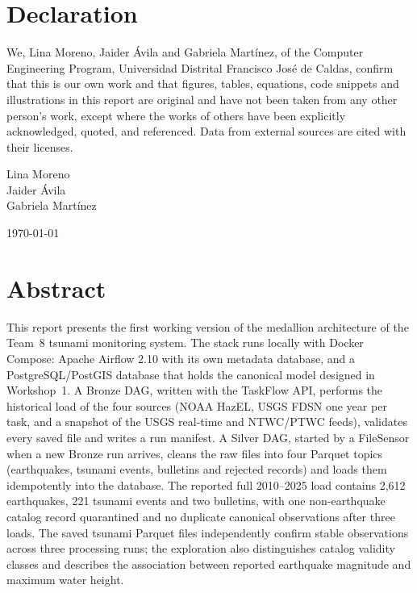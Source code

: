 \documentclass[a4paper,11pt,oneside]{book}
\begin{document}
    \newpage
    \thispagestyle{empty}
    \chapter*{\Large Declaration}
    We, Lina Moreno, Jaider \'Avila and Gabriela Mart\'inez, of the Computer Engineering Program, Universidad Distrital Francisco Jos\'e de Caldas, confirm that this is our own work and that figures, tables, equations, code snippets and illustrations in this report are original and have not been taken from any other person's work, except where the works of others have been explicitly acknowledged, quoted, and referenced. Data from external sources are cited with their licenses.
    ~\\[1cm]
    \begin{flushright}
    Lina Moreno\\
    Jaider \'Avila\\
    Gabriela Mart\'inez

    \today
    \end{flushright}

    \chapter*{Abstract}
    This report presents the first working version of the medallion architecture of the Team~8 tsunami monitoring system.
The stack runs locally with Docker Compose: Apache Airflow 2.10 with its own metadata database, and a PostgreSQL/PostGIS database that holds the canonical model designed in Workshop~1.
A Bronze DAG, written with the TaskFlow API, performs the historical load of the four sources (NOAA HazEL, USGS FDSN one year per task, and a snapshot of the USGS real-time and NTWC/PTWC feeds), validates every saved file and writes a run manifest.
A Silver DAG, started by a FileSensor when a new Bronze run arrives, cleans the raw files into four Parquet topics (earthquakes, tsunami events, bulletins and rejected records) and loads them idempotently into the database.
The reported full 2010--2025 load contains 2,612 earthquakes, 221 tsunami events and two bulletins, with one non-earthquake catalog record quarantined and no duplicate canonical observations after three loads.
The saved tsunami Parquet files independently confirm stable observations across three processing runs; the exploration also distinguishes catalog validity classes and describes the association between reported earthquake magnitude and maximum water height.
\end{document}
